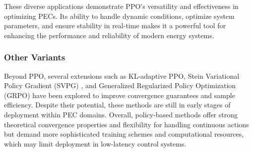 


These diverse applications demonstrate PPO's versatility and effectiveness in optimizing PECs. Its ability to handle dynamic conditions, optimize system parameters, and ensure stability in real-time makes it a powerful tool for enhancing the performance and reliability of modern energy systems.

\subsubsection{Other Variants}       

Beyond PPO, several extensions such as KL-adaptive PPO, Stein Variational Policy Gradient (SVPG) \cite{liu2017stein}, and Generalized Regularized Policy Optimization (GRPO) \cite{shao2024deepseekmath} have been explored to improve convergence guarantees and sample efficiency. Despite their potential, these methods are still in early stages of deployment within PEC domains. Overall, policy-based methods offer strong theoretical convergence properties and flexibility for handling continuous actions but demand more sophisticated training schemes and computational resources, which may limit deployment in low-latency control systems.

